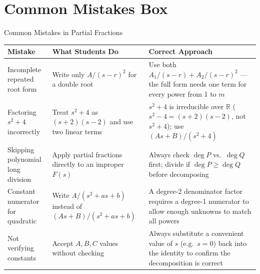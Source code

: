 \documentclass[12pt,a4paper]{article}
\begin{document}
\section{Common Mistakes Box}
\begin{mistakebox}{Common Mistakes in Partial Fractions}
\begin{tabular}{@{}p{4.2cm}p{4.2cm}p{5cm}@{}}
\toprule
\textbf{Mistake} & \textbf{What Students Do} & \textbf{Correct Approach} \\
\midrule
Incomplete repeated root form &
  Write only $A/(s-r)^2$ for a double root &
  Use both $A_1/(s-r)+A_2/(s-r)^2$ --- the full
  form needs one term for every power from 1 to $m$ \\
\addlinespace
Factoring $s^2+4$ incorrectly &
  Treat $s^2+4$ as $(s+2)(s-2)$ and use two linear terms &
  $s^2+4$ is irreducible over $\mathbb{R}$ ($s^2-4=(s+2)(s-2)$,
  not $s^2+4$); use $(As+B)/(s^2+4)$ \\
\addlinespace
Skipping polynomial long division &
  Apply partial fractions directly to an improper $F(s)$ &
  Always check $\deg P$ vs.\ $\deg Q$ first;
  divide if $\deg P \geq \deg Q$ before decomposing \\
\addlinespace
Constant numerator for quadratic &
  Write $A/(s^2+as+b)$ instead of $(As+B)/(s^2+as+b)$ &
  A degree-2 denominator factor requires a degree-1
  numerator to allow enough unknowns to match all powers \\
\addlinespace
Not verifying constants &
  Accept $A,B,C$ values without checking &
  Always substitute a convenient value of $s$ (e.g.\ $s=0$)
  back into the identity to confirm the decomposition is correct \\
\bottomrule
\end{tabular}
\end{mistakebox}

\end{document}
